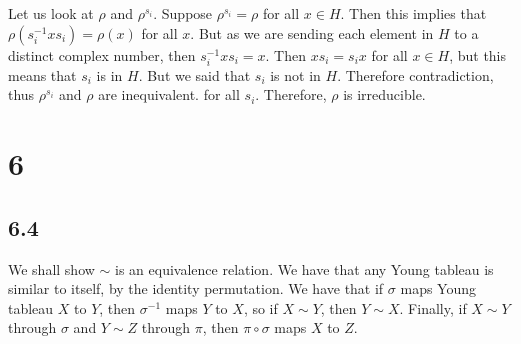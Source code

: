 \documentclass[]{article}
\begin{document}
Let us look at $\rho$ and $\rho^{s_i}$. Suppose $\rho^{s_i} = \rho$ for all $x \in H$. Then this implies that $\rho(s_i^{-1} x s_i) = \rho(x)$ for all $x$. But as we are sending each element in $H$ to a distinct complex number, then $s_i^{-1} x s_i = x$. Then $x s_i = s_i x$ for all $x \in H$, but this means that $s_i$ is in $H$. But we said that $s_i$ is not in $H$. Therefore contradiction, thus $\rho^{s_i}$ and $\rho$ are inequivalent. for all $s_i$. Therefore, $\rho$ is irreducible. 

\section*{6}
\subsection*{6.4}
We shall show $\sim$ is an equivalence relation. We have that any Young tableau is similar to itself, by the identity permutation. We have that if $\sigma$ maps Young tableau $X$ to $Y$, then $\sigma^{-1}$ maps $Y$ to $X$, so if $X \sim Y$, then $Y \sim X$. Finally, if $X \sim Y$ through $\sigma$ and $Y \sim Z$ through $\pi$, then $\pi \circ \sigma$ maps $X$ to $Z$. 
\end{document}
